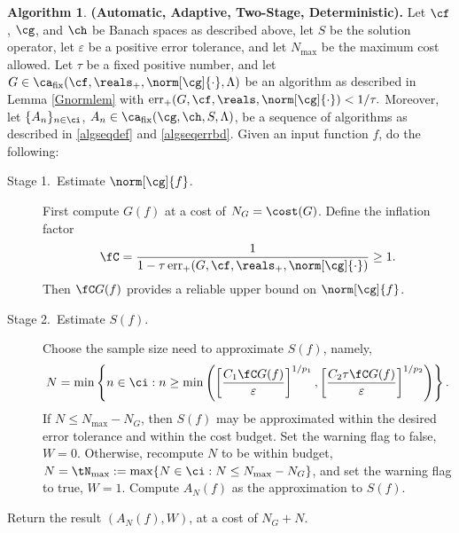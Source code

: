 \documentclass[final]{elsarticle}
\DeclareMathOperator{\err}{err}
\theoremstyle{definition}
\newtheorem{algo}{Algorithm}
\theoremstyle{remark}
\DeclareMathOperator{\fix}{fix}
\begin{document}
\begin{algo} \label{twostagedetalgo} {\bf (Automatic, Adaptive, Two-Stage, Deterministic).} Let $\cf$, $\cg$, and $\ch$ be Banach spaces as described above, let $S$ be the solution operator, let $\varepsilon$ be a positive error tolerance, and let $N_{\max}$ be the maximum cost allowed.  Let $\tau$ be a fixed positive number, and let $G \in \ca_{\fix}(\cf,\reals_+,\norm[\cg]{\cdot},\Lambda)$ be an algorithm as described in Lemma \ref{Gnormlem} with 
$\err_{+}(G,\cf,\reals,\norm[\cg]{\cdot}) < 1/\tau.$
Moreover, let  $\{A_n\}_{n \in \ci}$, $A_n  \in \ca_{\fix}(\cg,\ch,S,\Lambda)$, be a sequence of algorithms as described in  \eqref{algseqdef} and \eqref{algseqerrbd}.  Given an input function $f$, do the following:

\begin{description} 

\item[Stage 1.\ Estimate {$\norm[\cg]{f}$}.] First compute $G(f)$ at a cost of $N_{G} = \cost(G)$.   Define the inflation factor 
\begin{equation}\label{norminflate}
\fC =\frac{1}{1 - \tau \err_{+}(G,\cf,\reals_+,\norm[\cg]{\cdot})} \ge 1.
\end{equation}
Then $\fC G(f)$ provides a reliable upper bound on $\norm[\cg]{f}$.  

\item [Stage 2.\ Estimate {$S(f)$}.] Choose the sample size need to approximate $S(f)$, namely,
\[
N= \min\left\{ n \in \ci : n \ge \min\left( \left[\frac{C_1 \fC G(f)}{\varepsilon}\right]^{1/p_1}, \left[\frac{C_2 \tau \fC G(f)}{\varepsilon}\right]^{1/p_2} \right ) \right\}.
\]
If $N \le N_{\max}-N_G$, then $S(f)$ may be approximated within the desired error tolerance and within the cost budget.  Set the warning flag to false, $W=0$. Otherwise, recompute $N$ to be within budget, $N = \tN_{\max} := \max\{N \in \ci : N\le N_{\max} -  N_G\}$, and set the warning flag to true, $W=1$.  Compute $A_N(f)$ as the approximation to $S(f)$.
\end{description}

Return the result $(A_N(f),W)$, at a cost of $N_G+N$.  
\end{algo}
\end{document}
